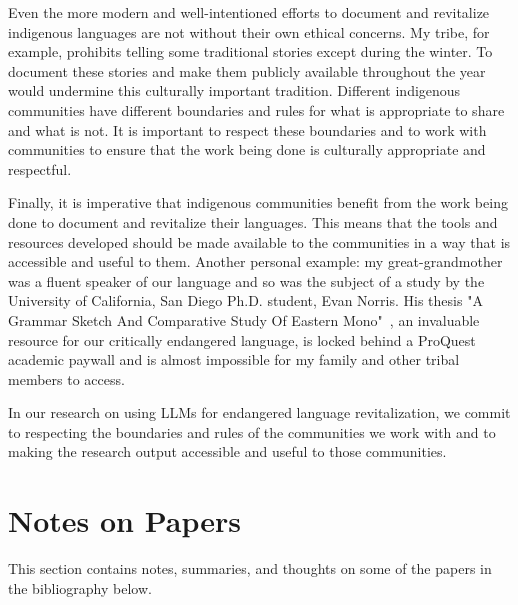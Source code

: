 \documentclass{article}
\begin{document}
Even the more modern and well-intentioned efforts to document and revitalize indigenous languages are not without their own ethical concerns.
My tribe, for example, prohibits telling some traditional stories except during the winter.
To document these stories and make them publicly available throughout the year would undermine this culturally important tradition.
Different indigenous communities have different boundaries and rules for what is appropriate to share and what is not.
It is important to respect these boundaries and to work with communities to ensure that the work being done is culturally appropriate and respectful.

Finally, it is imperative that indigenous communities benefit from the work being done to document and revitalize their languages.
This means that the tools and resources developed should be made available to the communities in a way that is accessible and useful to them.
Another personal example: my great-grandmother was a fluent speaker of our language and so was the subject of a study by the University of California, San Diego Ph.D. student, Evan Norris.
His thesis "A Grammar Sketch And Comparative Study Of Eastern Mono"~\cite{mnr_grammar}, an invaluable resource for our critically endangered language, is locked behind a ProQuest academic paywall and is almost impossible for my family and other tribal members to access.

In our research on using LLMs for endangered language revitalization, we commit to respecting the boundaries and rules of the communities we work with and to making the research output accessible and useful to those communities.

\section*{Notes on Papers}
This section contains notes, summaries, and thoughts on some of the papers in the bibliography below.
\end{document}
